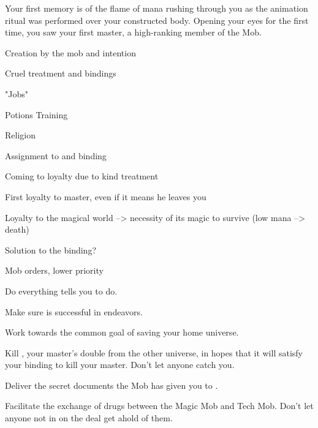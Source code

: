 \documentclass[char]{guildcamp3}
\begin{document}
\name{\cServant{}}



Your first memory is of the flame of mana rushing through you as the animation ritual was performed over your constructed body. Opening your eyes for the first time, you saw your first master, a high-ranking member of the Mob.

Creation by the mob and intention

Cruel treatment and bindings

"Jobs"

Potions Training

Religion

Assignment to \NobleOne{} and binding

Coming to loyalty due to kind treatment

First loyalty to master, even if it means he leaves you

Loyalty to the magical world --> necessity of its magic to survive
(low mana --> death)

Solution to the binding?

Mob orders, lower priority

\begin{itemz}[Goals]
  \item Do everything \cNobleOne{} tells you to do.
  \item Make sure \cNobleOne{} is successful in \cNobleOne{\their} endeavors.
  \item Work towards the common goal of saving your home universe.
  \item Kill \PoliOne{}, your master's double from the other universe, in hopes that it will satisfy your binding to kill your master. Don't let anyone catch you.
  \item Deliver the secret documents the Mob has given you to \SpecOpTwo{}.
  \item Facilitate the exchange of drugs between the Magic Mob and Tech Mob. Don't let anyone not in on the deal get ahold of them.
\end{itemz}
\end{document}

